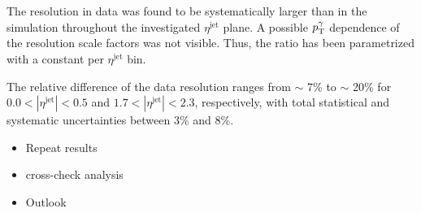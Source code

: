 The resolution in data was found to be systematically larger than in the simulation throughout the investigated $\eta^{\text{jet}}$ plane. 
A possible $p_{\text{T}}^{\gamma}$ dependence of the resolution scale factors was not visible. 
Thus, the ratio has been parametrized with a constant per $\eta^{\text{jet}}$ bin.

The relative difference of the data resolution ranges from $\sim$ 7\% to $\sim$ 20\% for  $0.0<|\eta^{\text{jet}}|<0.5$ and  $1.7<|\eta^{\text{jet}}|<2.3$, respectively, 
with total statistical and systematic uncertainties between 3\% and 8\%.



\begin{itemize}
\item Repeat results
\item cross-check analysis
\item Outlook
\end{itemize}

